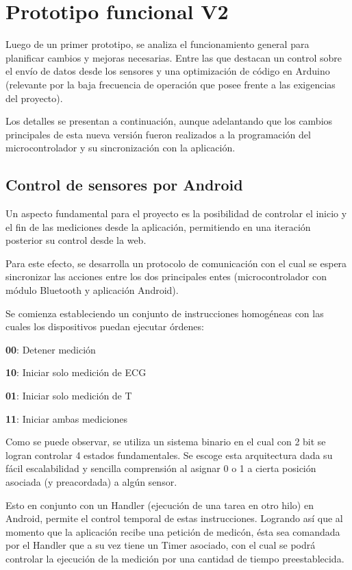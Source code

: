 \chapter{Prototipo funcional V2}\label{proto2}

Luego de un primer prototipo, se analiza el funcionamiento general para planificar cambios y mejoras necesarias. Entre las que destacan un control sobre el envío de datos desde los sensores y una optimización de código en Arduino (relevante por la baja frecuencia de operación que posee frente a las exigencias del proyecto).

Los detalles se presentan a continuación, aunque adelantando que los cambios principales de esta nueva versión fueron realizados a la programación del microcontrolador y su sincronización con la aplicación.

\section{Control de sensores por Android}

Un aspecto fundamental para el proyecto es la posibilidad de controlar el inicio y el fin de las mediciones desde la aplicación, permitiendo en una iteración posterior su control desde la web.

Para este efecto, se desarrolla un protocolo de comunicación con el cual se espera sincronizar las acciones entre los dos principales entes (microcontrolador con módulo Bluetooth y aplicación Android).

Se comienza estableciendo un conjunto de instrucciones homogéneas con las cuales los dispositivos puedan ejecutar órdenes:

\textbf{00}: Detener medición

\textbf{10}: Iniciar solo medición de ECG

\textbf{01}: Iniciar solo medición de T

\textbf{11}: Iniciar ambas mediciones \newpage

Como se puede observar, se utiliza un sistema binario en el cual con 2 bit se logran controlar 4 estados fundamentales. Se escoge esta arquitectura dada su fácil escalabilidad y sencilla comprensión al asignar 0 o 1 a cierta posición asociada (y preacordada) a algún sensor.

Esto en conjunto con un Handler (ejecución de una tarea en otro hilo) en Android, permite el control temporal de estas instrucciones. Logrando así que al momento que la aplicación recibe una petición de medicón, ésta sea comandada por el Handler que a su vez tiene un Timer asociado, con el cual se podrá controlar la ejecución de la medición por una cantidad de tiempo preestablecida.

